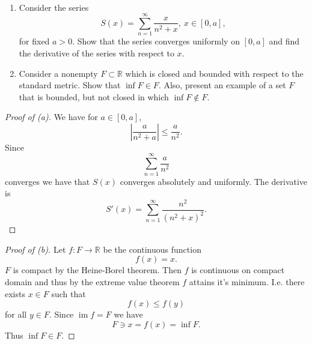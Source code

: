\begin{prob}[2024 1a]
    \  

    \begin{enumerate}[label=\alph*)]
        \item Consider the series 
            \[
                S(x) = \sum_{n=1}^\infty \frac{x}{n^2 + x}, 
                \ x \in [0,a], 
            \]
            for fixed $a > 0$. Show that the series converges 
            uniformly on $[0,a]$ and find the derivative of 
            the series with respect to $x$.
        \item Consider a nonempty $F \subset \mathbb R$ which is 
            closed and bounded with respect to the standard 
            metric. Show that $\inf F \in F$. Also, present an 
            example of a set $F$ that is bounded, but not closed 
            in which $\inf F \not\in F$.
    \end{enumerate}
\end{prob}
\begin{proof}[Proof of (a)]
    We have for $a \in [0,a]$, 
    \[
        \left|\frac{a}{n^2 + a}\right|
        \leq \frac{a}{n^2}.
    \]
    Since 
    \[
        \sum_{n=1}^\infty \frac{a}{n^2} 
    \]
    converges we have that $S(x)$ converges absolutely and uniformly.
    The derivative is 
    \[
        S'(x) = \sum_{n=1}^\infty \frac{n^2}{(n^2 + x)^2}.
    \]
\end{proof}
\begin{proof}[Proof of (b)]
    Let $f : F \to \mathbb R$ be the continuous function 
    \[
        f(x) = x. 
    \]
    $F$ is compact by the Heine-Borel theorem. 
    Then $f$ is continuous on compact domain and thus by the extreme 
    value theorem $f$ attains it's minimum. I.e. there exists 
    $x \in F$ such that 
    \[
        f(x) \leq f(y)  
    \]
    for all $y \in F$. Since $\operatorname{im} f = F$ we have 
    \[
        F \ni x = f(x) = \inf F. 
    \]
    Thus $\inf F \in F$.
\end{proof}
